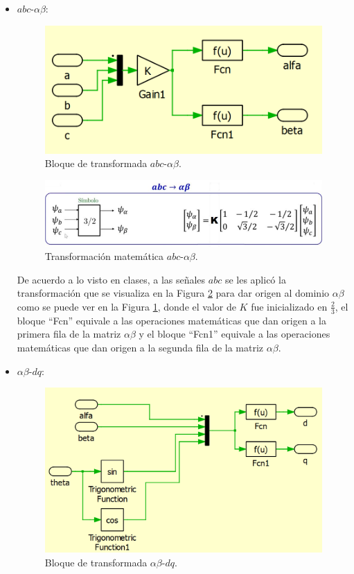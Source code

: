 \begin{itemize}
    \item $abc$-$\alpha\beta$:

    \begin{figure}
       \centering
       \includegraphics[width=0.5\linewidth]{Tarea 1/report/imagenes/p1a/abc-alphabetha.png}
       \caption{Bloque de transformada $abc$-$\alpha\beta$.}
       \label{abc-alphabetha}
    \end{figure}

    \begin{figure}
       \centering
       \includegraphics[width=0.5\linewidth]{Tarea 1/report/imagenes/p1a/formulaabc-alphabetha.png}
       \caption{Transformación matemática $abc$-$\alpha\beta$.}
       \label{formulaabc-alphabetha}
    \end{figure}

    De acuerdo a lo visto en clases, a las señales $abc$ se les aplicó la transformación que se visualiza en la Figura \ref{formulaabc-alphabetha} para dar origen al dominio $\alpha\beta$ como se puede ver en la Figura \ref{abc-alphabetha}, donde el valor de $K$ fue inicializado en $\frac{2}{3}$, el bloque ``Fcn'' equivale a las operaciones matemáticas que dan origen a la primera fila de la matriz $\alpha\beta$ y el bloque ``Fcn1''  equivale a las operaciones matemáticas que dan origen a la segunda fila de la matriz $\alpha\beta$.

    \item $\alpha\beta$-$dq$:

    \begin{figure}
       \centering
       \includegraphics[width=0.5\linewidth]{Tarea 1/report/imagenes/p1a/alphabetha-dq.png}
       \caption{Bloque de transformada $\alpha\beta$-$dq$.}
       \label{alphabetha-dq}
    \end{figure}


\end{itemize}
